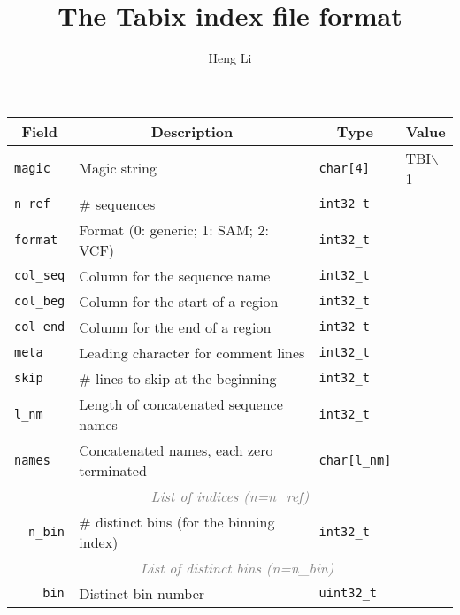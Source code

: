 \documentclass[10pt]{article}
\begin{document}
\title{The Tabix index file format}
\author{Heng Li}
\date{}

\maketitle

\begin{center}
\begin{tabular}{|l|l|l|l|l|l|l|}
\hline
\multicolumn{4}{|c|}{\bf Field} & \multicolumn{1}{c|}{\bf Description} & \multicolumn{1}{c|}{\bf Type} & \multicolumn{1}{c|}{\bf Value} \\
\hline\hline
\multicolumn{4}{|l|}{\tt magic} & Magic string & {\tt char[4]} & TBI$\backslash$1 \\
\hline
\multicolumn{4}{|l|}{\tt n\_ref} & \# sequences & {\tt int32\_t} & \\
\hline
\multicolumn{4}{|l|}{\tt format} & Format (0: generic; 1: SAM; 2: VCF) & {\tt int32\_t} & \\
\hline
\multicolumn{4}{|l|}{\tt col\_seq} & Column for the sequence name & {\tt int32\_t} & \\
\hline
\multicolumn{4}{|l|}{\tt col\_beg} & Column for the start of a region & {\tt int32\_t} & \\
\hline
\multicolumn{4}{|l|}{\tt col\_end} & Column for the end of a region & {\tt int32\_t} & \\
\hline
\multicolumn{4}{|l|}{\tt meta} & Leading character for comment lines & {\tt int32\_t} & \\
\hline
\multicolumn{4}{|l|}{\tt skip} & \# lines to skip at the beginning & {\tt int32\_t} & \\
\hline
\multicolumn{4}{|l|}{\tt l\_nm} & Length of concatenated sequence names & {\tt int32\_t} & \\
\hline
\multicolumn{4}{|l|}{\tt names} & Concatenated names, each zero terminated & {\tt char[l\_nm]} & \\
\hline
\multicolumn{7}{|c|}{\textcolor{gray}{\it List of indices (n=n\_ref)}}\\
\cline{2-7}
\hspace{0.1cm} & \multicolumn{3}{l|}{\tt n\_bin} & \# distinct bins (for the binning index) & {\tt int32\_t} & \\
\cline{2-7}
 & \multicolumn{6}{c|}{\textcolor{gray}{\it List of distinct bins (n=n\_bin)}} \\
\cline{3-7}
 & \hspace{0.1cm} & \multicolumn{2}{l|}{\tt bin} & Distinct bin number & {\tt uint32\_t} & \\

\end{tabular}
\end{center}
\end{document}
